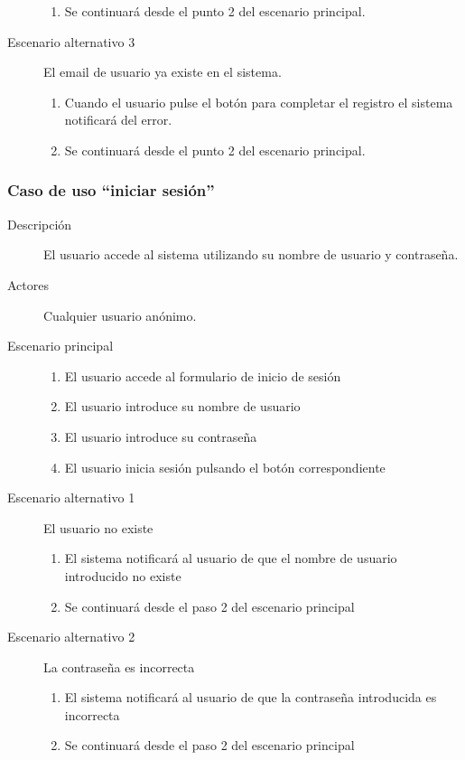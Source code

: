 \begin{description}
\begin{enumerate}
								\item Se continuará desde el punto 2 del escenario principal.
								\end{enumerate}
\item[Escenario alternativo 3]	El email de usuario ya existe en el sistema.
								\begin{enumerate}
								\item Cuando el usuario pulse el botón para completar el registro el sistema notificará del error.
								\item Se continuará desde el punto 2 del escenario principal.
								\end{enumerate}
\end{description}


\subsubsection{Caso de uso ``iniciar sesión''}
\begin{description}
\item[Descripción] El usuario accede al sistema utilizando su nombre de usuario y contraseña.
\item[Actores] Cualquier usuario anónimo.
\item[Escenario principal] \hfill
						 	\begin{enumerate}
							\item El usuario accede al formulario de inicio de sesión
							\item El usuario introduce su nombre de usuario
							\item El usuario introduce su contraseña
							\item El usuario inicia sesión pulsando el botón correspondiente
							\end{enumerate}
\item[Escenario alternativo 1] El usuario no existe
							\begin{enumerate}
							\item El sistema notificará al usuario de que el nombre de usuario introducido no existe
							\item Se continuará desde el paso 2 del escenario principal
							\end{enumerate}
\item [Escenario alternativo 2] La contraseña es incorrecta
							\begin{enumerate}
							\item El sistema notificará al usuario de que la contraseña introducida es incorrecta
							\item Se continuará desde el paso 2 del escenario principal
							\end{enumerate}							
\end{description}


